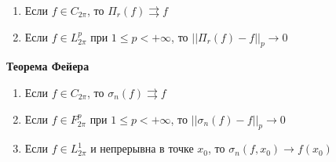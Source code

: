 \begin{consequence}
    \begin{enumerate}
        \item Если $f \in C_{2\pi}$, то $\Pi_r (f) \rightrightarrows f$
        \item Если $f \in L_{2\pi}^p$ при $1 \leqslant p < +\infty$, то $||\Pi_r (f) - f||_p \rightarrow 0$
    \end{enumerate}
\end{consequence}

\begin{theorem}
\textbf{Теорема Фейера}

    \begin{enumerate}
        \item Если $f \in C_{2\pi}$, то $\sigma_n (f) \rightrightarrows f$
        \item Если $f \in F_{2\pi}^p$ при $1 \leqslant p < +\infty$, то $||\sigma_n (f) - f||_p \rightarrow 0$
        \item Если $f \in L_{2\pi}^1$ и непрерывна в точке $x_0$, то $\sigma_n (f, x_0) \rightarrow f(x_0)$
    \end{enumerate}
\end{theorem}

